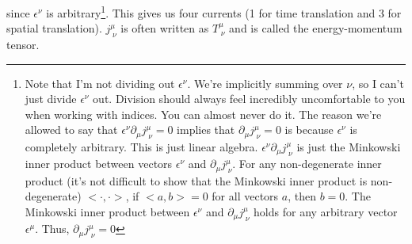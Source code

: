 since $\epsilon^\nu$ is arbitrary\footnote{Note that I'm not dividing out $\epsilon^\nu$. We're implicitly summing over $\nu$, so I can't just divide $\epsilon^\nu$ out. Division should always feel incredibly uncomfortable to you when working with indices. You can almost never do it. The reason we're allowed to say that $\epsilon^\nu\partial_\mu j^\mu_{\;\nu}=0$ implies that $\partial_\mu j^\mu_{\;\nu}=0$ is because $\epsilon^\nu$ is completely arbitrary. This is just linear algebra. $\epsilon^\nu\partial_\mu j^\mu_{\;\nu}$ is just the Minkowski inner product between vectors $\epsilon^\nu$ and $\partial_\mu j^\mu_{\;\nu}$. For any non-degenerate inner product (it's not difficult to show that the Minkowski inner product is non-degenerate) $<\cdot,\cdot>$, if $<a,b>=0$ for all vectors $a$, then $b=0$. The Minkowski inner product between $\epsilon^\nu$ and $\partial_\mu j^\mu_{\;\nu}$ holds for any arbitrary vector $\epsilon^\mu$. Thus, $\partial_\mu j^\mu_{\;\nu}=0$}. This gives us four currents (1 for time translation and 3 for spatial translation). $j^\mu_{\;\nu}$ is often written as $T^\mu_{\;\nu}$ and is called the energy-momentum tensor.\\

